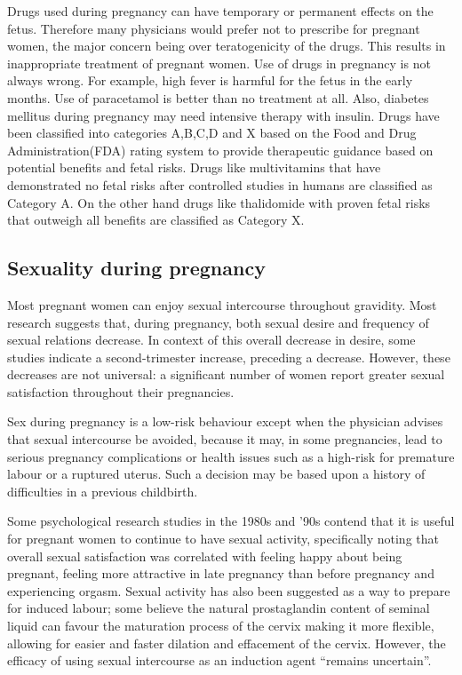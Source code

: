 \documentclass[12pt,a4paper,onecolumn]{article}
\begin{document}
Drugs used during pregnancy can have temporary or permanent effects on the fetus. Therefore many
physicians would prefer not to prescribe for pregnant women, the major concern being over
teratogenicity of the drugs. This results in inappropriate treatment of pregnant women. Use of drugs
in pregnancy is not always wrong. For example, high fever is harmful for the fetus in the early
months. Use of paracetamol is better than no treatment at all. Also, diabetes mellitus during
pregnancy may need intensive therapy with insulin. Drugs have been classified into categories
A,B,C,D and X based on the Food and Drug Administration(FDA) rating system to provide therapeutic
guidance based on potential benefits and fetal risks. Drugs like multivitamins that have
demonstrated no fetal risks after controlled studies in humans are classified as Category A. On the
other hand drugs like thalidomide with proven fetal risks that outweigh all benefits are classified
as Category X.

\subsection{Sexuality during pregnancy}

Most pregnant women can enjoy sexual intercourse throughout gravidity. Most research suggests that,
during pregnancy, both sexual desire and frequency of sexual relations decrease. In context of this
overall decrease in desire, some studies indicate a second-trimester increase, preceding a decrease.
However, these decreases are not universal: a significant number of women report greater sexual
satisfaction throughout their pregnancies.

Sex during pregnancy is a low-risk behaviour except when the physician advises that sexual
intercourse be avoided, because it may, in some pregnancies, lead to serious pregnancy complications
or health issues such as a high-risk for premature labour or a ruptured uterus. Such a decision may
be based upon a history of difficulties in a previous childbirth.

Some psychological research studies in the 1980s and '90s contend that it is useful for pregnant
women to continue to have sexual activity, specifically noting that overall sexual satisfaction was
correlated with feeling happy about being pregnant, feeling more attractive in late pregnancy than
before pregnancy and experiencing orgasm. Sexual activity has also been suggested as a way to
prepare for induced labour; some believe the natural prostaglandin content of seminal liquid can
favour the maturation process of the cervix making it more flexible, allowing for easier and faster
dilation and effacement of the cervix. However, the efficacy of using sexual intercourse as an
induction agent ``remains uncertain''.
\end{document}
